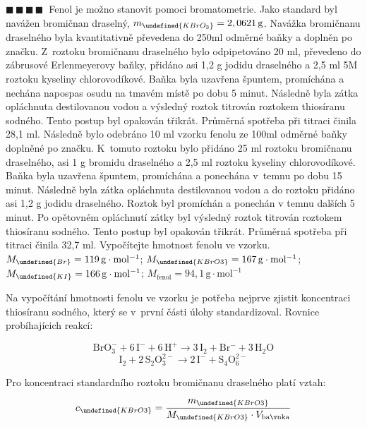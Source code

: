 \documentclass{book}
\let\ch\undefined
\newcommand{\ctyri}{$\blacksquare \, \blacksquare \, \blacksquare \, \blacksquare \; \; $}
\renewenvironment{quotation}{\par}{\par} %
\begin{document}
\hrulefill %
\begin{quotation}
\ctyri Fenol je možno stanovit pomoci bromatometrie. Jako standard byl navážen
bromičnan draselný, $m_{\ch{KBrO_{3}}}=2,0621\,\mathrm{g}$. Navážka bromičnanu
draselného byla kvantitativně převedena do 250ml odměrné baňky a doplněn
po značku. Z~roztoku bromičnanu draselného bylo odpipetováno 20 ml,
převedeno do zábrusové Erlenmeyerovy baňky, přidáno asi 1,2 g jodidu
draselného a 2,5 ml 5M roztoku kyseliny chlorovodíkové. Baňka byla
uzavřena špuntem, promíchána a nechána napospas osudu na tmavém místě
po dobu 5 minut. Následně byla zátka opláchnuta destilovanou vodou
a výsledný roztok titrován roztokem thiosíranu sodného. Tento postup
byl opakován třikrát. Průměrná spotřeba při titraci činila 28,1 ml.
Následně bylo odebráno 10 ml vzorku fenolu ze 100ml odměrné baňky
doplněné po značku. K~tomuto roztoku bylo přidáno 25 ml roztoku bromičnanu
draselného, asi 1 g bromidu draselného a 2,5 ml roztoku kyseliny chlorovodíkové.
Baňka byla uzavřena špuntem, promíchána a ponechána v~temnu po dobu
15 minut. Následně byla zátka opláchnuta destilovanou vodou a do roztoku
přidáno asi 1,2 g jodidu draselného. Roztok byl promíchán a ponechán
v temnu dalších 5 minut. Po opětovném opláchnutí zátky byl výsledný
roztok titrován roztokem thiosíranu sodného. Tento postup byl opakován
třikrát. Průměrná spotřeba při titraci činila 32,7 ml. Vypočítejte
hmotnost fenolu ve vzorku.\\$M_{\ch{Br}}=119\,\mathrm{g\cdot mol^{-1}}$;
$M_{\ch{KBrO3}}=167\,\mathrm{g\cdot mol^{-1}}$; $M_{\ch{KI}}=166\,\mathrm{g\cdot mol^{-1}}$;
$M_{\mathrm{fenol}}=94,1\,\mathrm{g\cdot mol^{-1}}$
\end{quotation} \dotfill \par 
Na vypočítání hmotnosti fenolu ve vzorku je potřeba nejprve zjistit
koncentraci thiosíranu sodného, který se v~první části úlohy standardizoval.
Rovnice probíhajícich reakcí: 

\[
\mathrm{BrO_{3}^{-}+6\,I^{-}+6\,H^{+}\rightarrow3\,I_{2}+Br^{-}+3\,H_{2}O}
\]
\[
\mathrm{I_{2}+2\,S_{2}O_{3}^{2-}\rightarrow2\,I^{-}+S_{4}O_{6}^{2-}}
\]

Pro koncentraci standardního roztoku bromičnanu draselného platí
vztah:

\[
c_{\ch{KBrO3}}=\frac{m_{\ch{KBrO3}}}{M_{\ch{KBrO3}}\cdot V_{\mathrm{baňka}}}
\]
\end{document}
